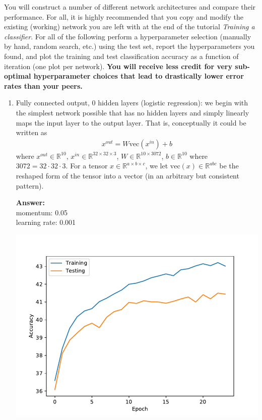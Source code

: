 \documentclass{article}
\newcommand{\field}[1]{\mathbb{#1}}
\newcommand{\1}{\mathbf{1}}
\newcommand{\R}{\field{R}} %
\def\vec{\text{vec}}
\begin{document}
You will construct a number of different network architectures and compare their performance.
For all, it is highly recommended that you copy and modify the existing (working) network you are left with at the end of the tutorial \emph{Training a classifier}.
For all of the following perform a hyperparameter selection (manually by hand, random search, etc.) using the test set, report the hyperparameters you found, and plot the training and test classification accuracy as a function of iteration (one plot per network).
\textbf{You will receive less credit for very sub-optimal hyperparameter choices that lead to drastically lower error rates than your peers.}
\begin{enumerate}
  \item Fully connected output, 0 hidden layers (logistic regression): we begin with the simplest network possible that has no hidden layers and simply linearly maps the input layer to the output layer. That is, conceptually it could be written as 
  \begin{align*}
  x^{out} = W \vec(x^{in}) +b
  \end{align*} 
  where $x^{out} \in \R^{10}$, $x^{in} \in \R^{32 \times 32 \times 3}$, $W \in \R^{10 \times 3072}$, $b \in \R^{10}$ where $3072 = 32 \cdot 32 \cdot 3$. For a tensor $x \in \R^{a \times b \times c}$, we let $\vec(x) \in \R^{a b c}$ be the reshaped form of the tensor into a vector (in an arbitrary but consistent pattern). 
  
  \textbf{Answer:}\\
  momentum: 0.05\\
  learning rate: 0.001
  
  \includegraphics[]{3_logReg.pdf}
  

\end{enumerate}
\end{document}
